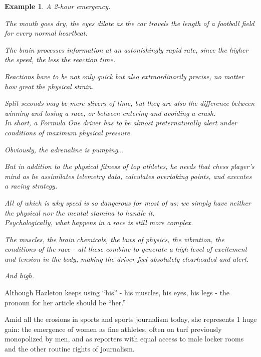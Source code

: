 \documentclass{book}
\numberwithin{equation}{section}
\newtheorem{example}{Example}[chapter]
\begin{document}
\begin{example}
    A 2-hour emergency.
    
    The mouth goes dry, the eyes dilate as the car travels the length of a football field for every normal heartbeat.
    
    The brain processes information at an astonishingly rapid rate, since the higher the speed, the less the reaction time.
    
    Reactions have to be not only quick but also extraordinarily precise, no matter how great the physical strain.
    
    Split seconds may be mere slivers of time, but they are also the difference between winning and losing a race, or between entering and avoiding a crash.
    \\
    
    In short, a Formula One driver has to be almost preternaturally alert under conditions of maximum physical pressure.
    
    Obviously, the adrenaline is pumping$\ldots$
    
    But in addition to the physical fitness of top athletes, he needs that chess player's mind as he assimilates telemetry data, calculates overtaking points, and executes a racing strategy.
    
    All of which is why speed is so dangerous for most of us: we simply have neither the physical nor the mental stamina to handle it.
    \\
    
    Psychologically, what happens in a race is still more complex.
    
    The muscles, the brain chemicals, the laws of physics, the vibration, the conditions of the race - all these combine to generate a high level of excitement and tension in the body, making the driver feel absolutely clearheaded and alert.
    
    And high.
\end{example}
Although Hazleton keeps using ``his'' - his muscles, his eyes, his legs - the pronoun for her article should be ``her.''

Amid all the erosions in sports and sports journalism today, she represents 1 huge gain: the emergence of women as fine athletes, often on turf previously monopolized by men, and as reporters with equal access to male locker rooms and the other routine rights of journalism.
\end{document}
